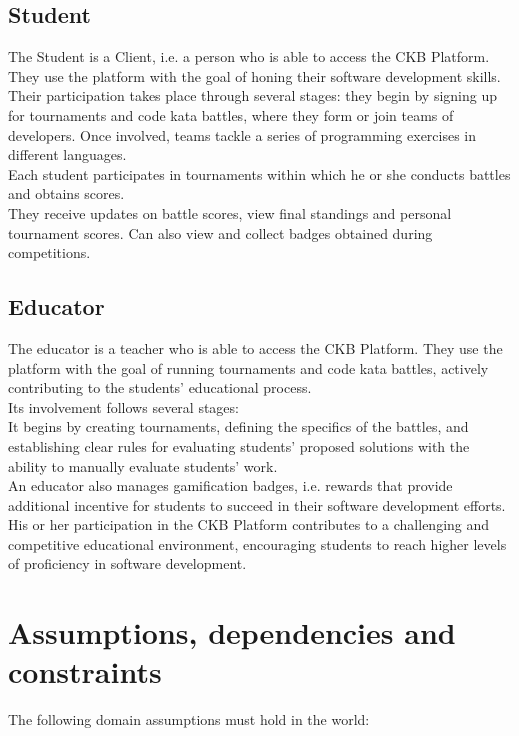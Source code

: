 \subsection{Student}
The Student is a Client, i.e. a person who is able to access the CKB Platform.\\ 
They use the platform with the goal of honing their software development skills. Their participation takes place through several stages: they begin by signing up for tournaments and code kata battles, where they form or join teams of developers. Once involved, teams tackle a series of programming exercises in different languages. \\
Each student participates in tournaments within which he or she conducts battles and obtains scores.\\
They receive updates on battle scores, view final standings and personal tournament scores. Can also view and collect badges obtained during competitions.


\subsection{Educator}
The educator is a teacher who is able to access the CKB Platform. They use the platform with the goal of running tournaments and code kata battles, actively contributing to the students' educational process.\\
Its involvement follows several stages:\\
It begins by creating tournaments, defining the specifics of the battles, and establishing clear rules for evaluating students' proposed solutions with the ability to manually evaluate students' work.\\
An educator also manages gamification badges, i.e. rewards that provide additional incentive for students to succeed in their software development efforts.\\
His or her participation in the CKB Platform contributes to a challenging and competitive educational environment, encouraging students to reach higher levels of proficiency in software development.

\section{Assumptions, dependencies and constraints}
The following domain assumptions must hold in the world:


